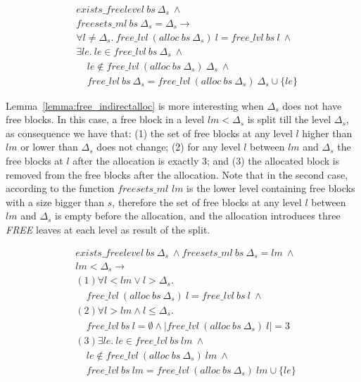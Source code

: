 \begin{lemma} 
\label{lemma:free_directalloc}
\begin{align*}
&exists\_freelevel\ bs\ \Delta_s\ \wedge\\
&freesets\_ml\ bs\ \Delta_s = \Delta_s \longrightarrow\\
&\forall l \ne \Delta_s.\ free\_lvl\ (alloc\ bs\ \Delta_s)\ l =  free\_lvl\ bs\ l\ \wedge\\
&\exists le.\ le \in free\_lvl\ bs\ \Delta_s\ \wedge\\
&\ \ \ \ \ le \notin free\_lvl\ (alloc\ bs\ \Delta_s)\ \Delta_s\ \wedge\\
&\ \ \ \ \ free\_lvl\ bs\ \Delta_s =  free\_lvl\ (alloc\ bs\ \Delta_s)\ \Delta_s \cup \lbrace le \rbrace
\end{align*}
\end{lemma}

Lemma~\ref{lemma:free_indirectalloc} is more interesting when $\Delta_s$ does not have free blocks. In this case, a free block in a level $lm < \Delta_s$ is split till the level $\Delta_s$, as consequence we have that:  (1) the set of free blocks at any level $l$ higher than $lm$ or lower than $\Delta_s$ does not change; (2) for any level $l$ between $lm$ and $\Delta_s$ the free blocks at $l$ after the allocation is exactly $3$; and (3) the allocated block is removed from the free blocks after the allocation. Note that in the second case, according to the function $freesets\_ml$ $lm$ is the lower level containing free blocks with a size bigger than $s$, therefore the set of free blocks at any level $l$ between $lm$ and $\Delta_s$ is empty before the allocation, and the allocation introduces three \emph{FREE} leaves at each level as result of the split.
 
\begin{lemma} 
	\label{lemma:free_indirectalloc}
\end{lemma}
\vspace{-7pt}
\begin{align*}
&exists\_freelevel\ bs\ \Delta_s\ \wedge freesets\_ml\ bs\ \Delta_s = lm\ \wedge\\
&lm < \Delta_s \longrightarrow\\
&(1) \forall l < lm \vee l > \Delta_s.\\
&\ \ \ \ \ free\_lvl\ (alloc\ bs\ \Delta_s)\ l = free\_lvl\ bs\ l\ \wedge\\
&(2) \forall l > lm \wedge l \le \Delta_s.\\
&\ \ \ \ \ free\_lvl\ bs\ l = \emptyset \wedge |free\_lvl\ (alloc\ bs\ \Delta_s)\ l| = 3\\
&(3) \exists le.\ le \in free\_lvl\ bs\ lm\ \wedge\\
&\ \ \ \ \ le \notin free\_lvl\ (alloc\ bs\ \Delta_s)\ lm\ \wedge\\
&\ \ \ \ \ free\_lvl\ bs\ lm = free\_lvl\ (alloc\ bs\ \Delta_s)\ lm \cup \lbrace le \rbrace\ 
\end{align*}

